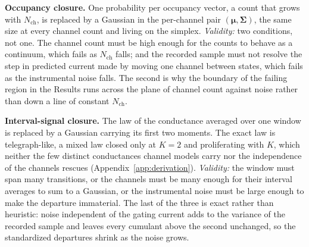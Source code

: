 \begin{tcolorbox}[title={The two Gaussian approximations}, colback=gray!5, colframe=gray!55]
\textbf{Occupancy closure.} One probability per occupancy vector, a count that grows with
$N_{\mathrm{ch}}$, is replaced by a Gaussian in the per-channel pair $(\boldsymbol{\mu},\boldsymbol{\Sigma})$, the
same size at every channel count and living on the simplex.
\emph{Validity:} two conditions, not one. The channel count must be high enough for the counts to
behave as a continuum, which fails as $N_{\mathrm{ch}}$ falls; and the recorded sample must not
resolve the step in predicted current made by moving one channel between states, which fails as
the instrumental noise falls. The second is why the boundary of the failing region in the Results
runs across the plane of channel count against noise rather than down a line of constant
$N_{\mathrm{ch}}$.

\smallskip
\textbf{Interval-signal closure.} The law of the conductance averaged over one window is replaced
by a Gaussian carrying its first two moments. The exact law is telegraph-like, a mixed law closed
only at $K=2$ and proliferating with $K$, which neither the few distinct conductances channel
models carry nor the independence of the channels rescues (Appendix~\ref{app:derivation}).
\emph{Validity:} the window must span many transitions, or the channels must be many enough for
their interval averages to sum to a Gaussian, or the instrumental noise must be large
enough to make the departure immaterial. The last of the three is exact rather than heuristic: noise
independent of the gating current adds to the variance of the recorded sample and leaves every
cumulant above the second unchanged, so the standardized departures shrink as the noise grows.


\end{tcolorbox}
